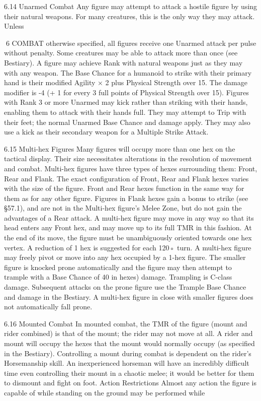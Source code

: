 \documentclass[a4paper]{article}
\begin{document}
\begin{multicols}{3}
6.14 Unarmed Combat
Any figure may attempt to attack a hostile figure
by using their natural weapons. For many creatures, this is the only way they may attack. Unless

6 COMBAT
otherwise specified, all figures receive one Unarmed attack per pulse without penalty. Some
creatures may be able to attack more than once (see
Bestiary). A figure may achieve Rank with natural
weapons just as they may with any weapon.
The Base Chance for a humanoid to strike with
their primary hand is their modified Agility × 2
plus Physical Strength over 15. The damage modifier is -4 (+ 1 for every 3 full points of Physical
Strength over 15).
Figures with Rank 3 or more Unarmed may kick
rather than striking with their hands, enabling them
to attack with their hands full. They may attempt to
Trip with their feet; the normal Unarmed Base
Chance and damage apply. They may also use a
kick as their secondary weapon for a Multiple
Strike Attack.

6.15 Multi-hex Figures
Many figures will occupy more than one hex on
the tactical display. Their size necessitates alterations in the resolution of movement and combat.
Multi-hex figures have three types of hexes surrounding them: Front, Rear and Flank. The exact
configuration of Front, Rear and Flank hexes varies
with the size of the figure. Front and Rear hexes
function in the same way for them as for any other
figure. Figures in Flank hexes gain a bonus to
strike (see §57.1), and are not in the Multi-hex
figure’s Melee Zone, but do not gain the advantages of a Rear attack.
A multi-hex figure may move in any way so that its
head enters any Front hex, and may move up to its
full TMR in this fashion. At the end of its move,
the figure must be unambiguously oriented towards
one hex vertex. A reduction of 1 hex is suggested
for each 120◦ turn.
A multi-hex figure may freely pivot or move into
any hex occupied by a 1-hex figure. The smaller
figure is knocked prone automatically and the
figure may then attempt to trample with a Base
Chance of 40%
in hexes) damage. Trampling is C-class damage.
Subsequent attacks on the prone figure use the
Trample Base Chance and damage in the Bestiary.
A multi-hex figure in close with smaller figures
does not automatically fall prone.

6.16 Mounted Combat
In mounted combat, the TMR of the figure (mount
and rider combined) is that of the mount; the rider
may not move at all. A rider and mount will occupy the hexes that the mount would normally
occupy (as specified in the Bestiary).
Controlling a mount during combat is dependent
on the rider’s Horsemanship skill. An inexperienced horseman will have an incredibly difficult
time even controlling their mount in a chaotic
melee; it would be better for them to dismount and
fight on foot.
Action Restrictions
Almost any action the figure is capable of while
standing on the ground may be performed while


\end{multicols}
\end{document}
